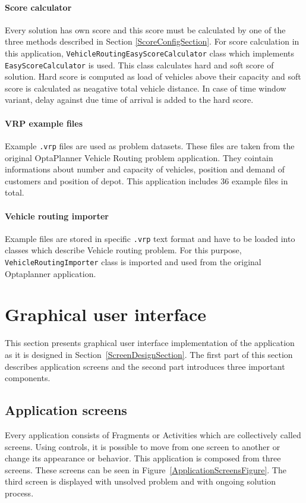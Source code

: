 \paragraph{Score calculator}
Every solution has own score and this score must be calculated by one of the three methods described in Section
\ref{ScoreConfigSection}. For score calculation in this application, \texttt{VehicleRoutingEasyScoreCalculator} class
which implements \texttt{EasyScoreCalculator} is used. This class calculates hard and soft score of solution. Hard score
is computed as load of vehicles above their capacity and soft score is calculated as neagative total vehicle distance.
In case of time window variant, delay against due time of arrival is added to the hard score.

\paragraph{VRP example files}
Example \texttt{.vrp} files are used as problem datasets. These files are taken from the original OptaPlanner Vehicle
Routing problem application. They cointain informations about number and capacity of vehicles, position and demand of
customers and position of depot. This application includes 36 example files in total.

\paragraph{Vehicle routing importer}
Example files are stored in specific \texttt{.vrp} text format and have to be loaded into classes which describe
Vehicle routing problem. For this purpose, \texttt{VehicleRoutingImporter} class is imported and used from the original
Optaplanner application.

\section{Graphical user interface}\label{GuiSection}
This section presents graphical user interface implementation of the application as it is designed in
Section~\ref{ScreenDesignSection}. The first part of this section describes application screens and the second part
introduces three important components.

\subsection{Application screens}
Every application consists of Fragments or Activities which are collectively called screens. Using controls, it is
possible to move from one screen to another or change its appearance or behavior. This application is composed from
three screens. These screens can be seen in Figure~\ref{ApplicationScreensFigure}. The third screen is displayed with
unsolved problem and with ongoing solution process.

